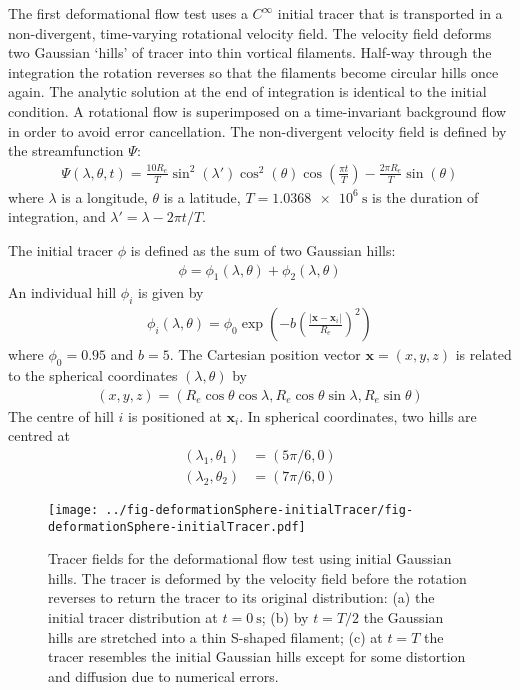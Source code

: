 The first deformational flow test uses a $C^\infty$ initial tracer that is transported in a non-divergent, time-varying rotational velocity field.
The velocity field deforms two Gaussian `hills' of tracer into thin vortical filaments.  Half-way through the integration the rotation reverses so that the filaments become circular hills once again.  The analytic solution at the end of integration is identical to the initial condition.
A rotational flow is superimposed on a time-invariant background flow in order to avoid error cancellation.
The non-divergent velocity field is defined by the streamfunction $\Psi$:
\begin{align}
	\Psi(\lambda, \theta, t) = \frac{10 R_e}{T} \sin^2 \left(\lambda'\right) \cos^2 \left(\theta\right) \cos \left( \frac{\pi t}{T} \right) - \frac{2 \pi R_e}{T} \sin\left(\theta\right)
\end{align}
where $\lambda$ is a longitude, $\theta$ is a latitude, $T = \SI{1.0368e6}{\second}$ is the duration of integration, and $\lambda' = \lambda - 2 \pi t / T$.

The initial tracer $\phi$ is defined as the sum of two Gaussian hills:
\begin{align}
	\phi = \phi_1(\lambda, \theta) + \phi_2(\lambda, \theta)
\end{align}
An individual hill $\phi_i$ is given by
\begin{align}
	\phi_i(\lambda, \theta) = \phi_0 \exp\left( -b \left( \frac{|\mathbf{x} - \mathbf{x}_i|}{R_e} \right)^2 \right)
\end{align}
where $\phi_0 = 0.95$ and $b = 5$.  The Cartesian position vector $\mathbf{x} = (x,y,z)$ is related to the spherical coordinates $(\lambda, \theta)$ by
\begin{align}
	(x,y,z) = (R_e \cos \theta \cos \lambda, R_e \cos \theta \sin \lambda, R_e \sin \theta) \label{eqn:spherical-cartesian}
\end{align}
The centre of hill $i$ is positioned at $\mathbf{x}_i$.  In spherical coordinates, two hills are centred at
\begin{align}
	(\lambda_1,\theta_1) &= (5 \pi /6, 0) \\
	(\lambda_2,\theta_2) &= (7 \pi /6, 0)
\end{align}

\begin{figure}
	\centering
	\texttt{[image: ../fig-deformationSphere-initialTracer/fig-deformationSphere-initialTracer.pdf]}
	\caption{Tracer fields for the deformational flow test using initial Gaussian hills.  The tracer is deformed by the velocity field before the rotation reverses to return the tracer to its original distribution: (a) the initial tracer distribution at $t = \SI{0}{\second}$; (b) by $t=T/2$ the Gaussian hills are stretched into a thin S-shaped filament; (c) at $t=T$ the tracer resembles the initial Gaussian hills except for some distortion and diffusion due to numerical errors.
	}
	\label{fig:deformationSphere-evolution}
\end{figure}

